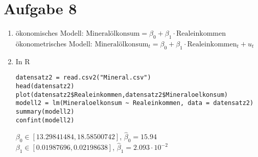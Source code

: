 \documentclass{article}
\begin{document}
	\section*{Aufgabe 8}
	\begin{enumerate}[label=(\alph*)]
		\item ökonomisches Modell: $\text{Mineralölkonsum} = \beta_0 + \beta_1\cdot\text{Realeinkommen}$ \\
		ökonometrisches Modell: $\text{Mineralölkonsum}_t = \beta_0 + \beta_1\cdot
		\text{Realeinkommen}_t + u_t$
		\item In R
		\begin{lstlisting}[style=R]
datensatz2 = read.csv2("Mineral.csv")
head(datensatz2)
plot(datensatz2$Realeinkommen,datensatz2$Mineraloelkonsum)
modell2 = lm(Mineraloelkonsum ~ Realeinkommen, data = datensatz2)
summary(modell2)
confint(modell2)
		\end{lstlisting}
		$\beta_0\in [13.29841484,18.58500742]$, $\hat{\beta}_0=15.94$ \\
		$\beta_1\in [0.01987696,0.02198638]$, $\hat{\beta}_1=2.093\cdot 10^{-2}$
	\end{enumerate}
	
\end{document}
